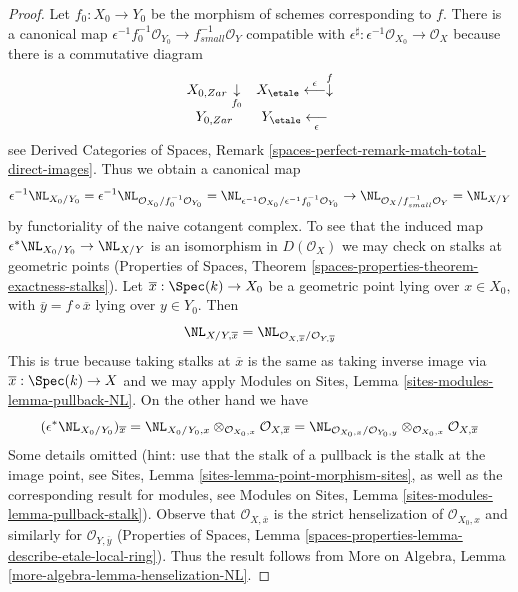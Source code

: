 \begin{proof}
Let $f_0 : X_0 \to Y_0$ be the morphism of schemes corresponding to $f$.
There is a canonical map
$\epsilon^{-1}f_0^{-1}\mathcal{O}_{Y_0} \to f_{small}^{-1}\mathcal{O}_Y$
compatible with
$\epsilon^\sharp : \epsilon^{-1}\mathcal{O}_{X_0} \to \mathcal{O}_X$
because there is a commutative diagram
$$
\begin{array}{cc}X_{0, Zar} \underset{f_0}{\downarrow} & X_\etale \overset{\epsilon}{\longleftarrow}\overset{f}{\downarrow} \\ Y_{0, Zar} & Y_\etale \underset{\epsilon}{\longleftarrow}\end{array}
$$
see Derived Categories of Spaces, Remark
\ref{spaces-perfect-remark-match-total-direct-images}.
Thus we obtain a canonical map
$$
\epsilon^{-1}\NL_{X_0/Y_0} =
\epsilon^{-1}\NL_{\mathcal{O}_{X_0}/f_0^{-1}\mathcal{O}_{Y_0}} =
\NL_{\epsilon^{-1}\mathcal{O}_{X_0}/\epsilon^{-1}f_0^{-1}\mathcal{O}_{Y_0}}
\to
\NL_{\mathcal{O}_X/f^{-1}_{small}\mathcal{O}_Y} = \NL_{X/Y}
$$
by functoriality of the naive cotangent complex.
To see that the induced map $\epsilon^*\NL_{X_0/Y_0} \to \NL_{X/Y}$ is an
isomorphism in $D(\mathcal{O}_X)$ we may check on stalks at geometric points
(Properties of Spaces, Theorem
\ref{spaces-properties-theorem-exactness-stalks}).
Let $\overline{x} : \Spec(k) \to X_0$
be a geometric point lying over $x \in X_0$, with
$\overline{y} = f \circ \overline{x}$ lying over $y \in Y_0$. Then
$$
\NL_{X/Y, \overline{x}} =
\NL_{\mathcal{O}_{X, \overline{x}}/\mathcal{O}_{Y, \overline{y}}}
$$
This is true because taking stalks at $\overline{x}$ is the same
as taking inverse image via $\overline{x} : \Spec(k) \to X$
and we may apply Modules on Sites, Lemma \ref{sites-modules-lemma-pullback-NL}.
On the other hand we have
$$
(\epsilon^*\NL_{X_0/Y_0})_{\overline{x}} =
\NL_{X_0/Y_0, x} \otimes_{\mathcal{O}_{X_0, x}}
\mathcal{O}_{X, \overline{x}} =
\NL_{\mathcal{O}_{X_0, x}/\mathcal{O}_{Y_0, y}}
\otimes_{\mathcal{O}_{X_0, x}} \mathcal{O}_{X, \overline{x}}
$$
Some details omitted (hint: use that the stalk of a pullback
is the stalk at the image point, see
Sites, Lemma \ref{sites-lemma-point-morphism-sites},
as well as the corresponding result for modules, see
Modules on Sites, Lemma \ref{sites-modules-lemma-pullback-stalk}).
Observe that $\mathcal{O}_{X, \overline{x}}$ is the strict
henselization of $\mathcal{O}_{X_0, x}$ and similarly
for $\mathcal{O}_{Y, \overline{y}}$
(Properties of Spaces, Lemma
\ref{spaces-properties-lemma-describe-etale-local-ring}).
Thus the result follows from
More on Algebra,
Lemma \ref{more-algebra-lemma-henselization-NL}.
\end{proof}

